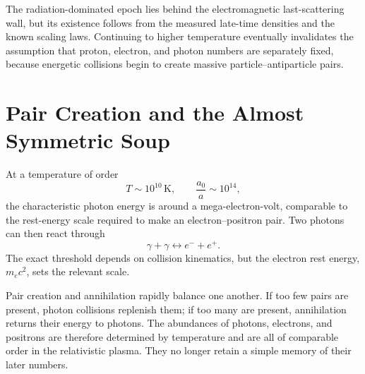 The radiation-dominated epoch lies behind the electromagnetic last-scattering wall, but its existence follows from the measured late-time densities and the known scaling laws. Continuing to higher temperature eventually invalidates the assumption that proton, electron, and photon numbers are separately fixed, because energetic collisions begin to create massive particle--antiparticle pairs.

\begin{classroomqa}
\end{classroomqa}

\section{Pair Creation and the Almost Symmetric Soup}

At a temperature of order
\begin{equation}
T\sim10^{10}\,\mathrm{K},
\qquad
\frac{a_0}{a}\sim10^{14},
\end{equation}
the characteristic photon energy is around a mega-electron-volt, comparable to the rest-energy scale required to make an electron--positron pair. Two photons can then react through
\begin{equation}
\gamma+\gamma
\longleftrightarrow
e^-+e^+.
\label{eq:c07-pair-reaction}
\end{equation}
The exact threshold depends on collision kinematics, but the electron rest energy, \(m_ec^2\), sets the relevant scale.

Pair creation and annihilation rapidly balance one another. If too few pairs are present, photon collisions replenish them; if too many are present, annihilation returns their energy to photons. The abundances of photons, electrons, and positrons are therefore determined by temperature and are all of comparable order in the relativistic plasma. They no longer retain a simple memory of their later numbers.

